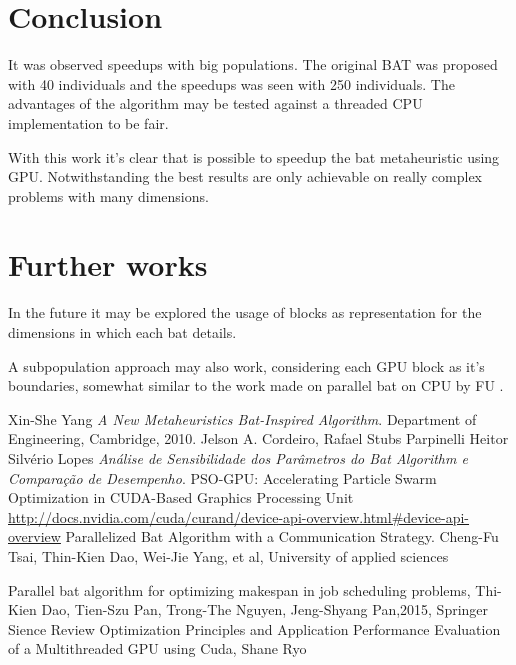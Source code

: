 \documentclass[conference]{IEEEtran}
\begin{document}
\section{Conclusion}

It was observed speedups with big populations. The original BAT was
proposed with 40 individuals and the speedups was seen with 250
individuals.
The advantages of the algorithm may be tested against a threaded CPU implementation to be fair.

With this work it's clear that is possible to speedup the bat metaheuristic using GPU. Notwithstanding the best results are only achievable on really complex problems with many dimensions.

\section{Further works}

In the future it may be explored the usage of blocks as representation for the
dimensions in which each bat details.

A subpopulation approach may also work, considering each GPU block as it's boundaries, somewhat similar to the work made on parallel bat on CPU by FU \cite{paralellCPU}.

\begin{thebibliography}{1}

    Xin-She Yang \emph{A New Metaheuristics Bat-Inspired Algorithm}. Department of Engineering, Cambridge, 2010.
    Jelson A. Cordeiro, Rafael Stubs Parpinelli Heitor Silvério Lopes \emph{Análise de Sensibilidade dos Parâmetros do Bat Algorithm e Comparação de Desempenho}.
    PSO-GPU: Accelerating Particle Swarm Optimization in CUDA-Based Graphics Processing Unit
    \url{http://docs.nvidia.com/cuda/curand/device-api-overview.html#device-api-overview}
    Parallelized Bat Algorithm with a Communication Strategy. Cheng-Fu Tsai, Thin-Kien Dao, Wei-Jie Yang, et al, University of applied sciences

    Parallel bat algorithm for optimizing makespan in job scheduling problems, Thi-Kien Dao, Tien-Szu Pan, Trong-The Nguyen, Jeng-Shyang Pan,2015, Springer Sience Review
    Optimization Principles and Application Performance Evaluation of a Multithreaded GPU using Cuda, Shane Ryo

\end{thebibliography}
\end{document}
